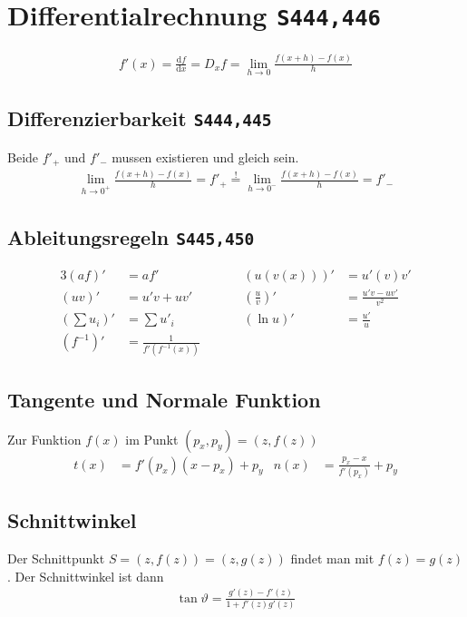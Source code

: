\documentclass[a4paper, twocolumn]{article}
\newcommand{\noticeq}{\ensuremath{\stackrel{!}{=}}}
\newcommand{\dd}[1]{\ensuremath{\mathrm{d}#1}}
\newcommand{\df}[2]{\ensuremath{\frac{\dd{#1}}{\dd{#2}}}}
\newcommand{\brpage}[1]{\textcolor{red!70!black}{\small\texttt{S#1}}}
\begin{document}
{\section{Differentialrechnung \brpage{444,446}}
\begin{align*}
  f'(x) = \df{f}{x} = D_x f = \lim_{h\to 0} \frac{f(x+h) - f(x)}{h}
\end{align*}

\subsection{Differenzierbarkeit \brpage{444,445}}
Beide \(f'_+ \text{ und } f'_-\) mussen existieren und gleich sein.
\begin{align*}
  \lim_{h\to 0^+} \frac{f(x+h) - f(x)}{h} = f'_+ \noticeq \lim_{h\to 0^-} \frac{f(x+h) - f(x)}{h} = f'_-
\end{align*}

\subsection{Ableitungsregeln \brpage{445,450}}
\begin{alignat*}{3}
  (af)' &= af' &\quad&& (u(v(x)))' &= u'(v)v' \\
  (uv)' &= u'v + uv' &\quad&& \left(\frac{u}{v}\right)' &= \frac{u'v-uv'}{v^2} \\
  \left(\sum u_i\right)' &= \sum u'_i &\quad&& (\ln u)' &= \frac{u'}{u} \\
  (f^{-1})' &= \frac{1}{f'(f^{-1}(x))}
\end{alignat*}

\subsection{Tangente und Normale Funktion}
Zur Funktion \(f(x)\) im Punkt \((p_x, p_y) = (z, f(z))\)
\begin{align*}
  t(x) &= f'(p_x)(x - p_x) + p_y &
  n(x) &= \frac{p_x - x}{f'(p_x)} + p_y
\end{align*}

\subsection{Schnittwinkel}
Der Schnittpunkt \(S = (z,f(z)) = (z,g(z))\) findet man mit \(f(z) = g(z)\). Der Schnittwinkel ist dann
\begin{align*}
  \tan\vartheta = \frac{g'(z) - f'(z)}{1 + f'(z)g'(z)}
\end{align*}

}
\end{document}
